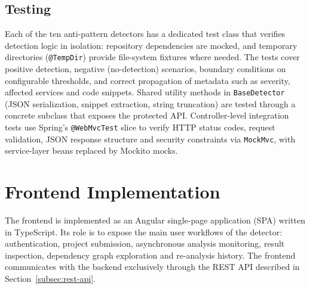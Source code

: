 
\subsection{Testing}
\label{subsec:testing}

\par Each of the ten anti-pattern detectors has a dedicated test class that verifies detection logic in isolation: repository dependencies are mocked, and temporary directories (\texttt{@TempDir}) provide file-system fixtures where needed. The tests cover positive detection, negative (no-detection) scenarios, boundary conditions on configurable thresholds, and correct propagation of metadata such as severity, affected services and code snippets. Shared utility methods in \texttt{BaseDetector} (JSON serialization, snippet extraction, string truncation) are tested through a concrete subclass that exposes the protected API. Controller-level integration tests use Spring's \texttt{@WebMvcTest} slice to verify HTTP status codes, request validation, JSON response structure and security constraints via \texttt{MockMvc}, with service-layer beans replaced by Mockito mocks.


\section{Frontend Implementation}
\label{sec:frontend-impl}

\par The frontend is implemented as an Angular single-page application (SPA) written in TypeScript. Its role is to expose the main user workflows of the detector: authentication, project submission, asynchronous analysis monitoring, result inspection, dependency graph exploration and re-analysis history. The frontend communicates with the backend exclusively through the REST API described in Section~\ref{subsec:rest-api}.

